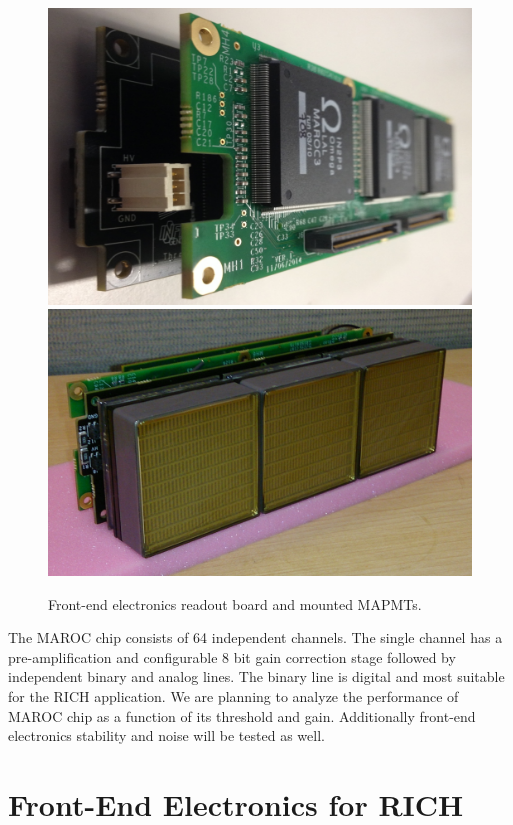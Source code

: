 \begin{figure}[htb]
  \centering
  \includegraphics[width=0.9\linewidth]{figures/fe1.pdf}
  \includegraphics[width=0.9\linewidth]{figures/frontendPMT.pdf}
  \caption{Front-end electronics readout board and mounted MAPMTs.}
  \label{fig:feboards}
\end{figure}

The MAROC chip consists of 64 independent channels.
The single channel has a pre-amplification and configurable 8 bit gain correction stage followed by independent binary and analog lines.
The binary line is digital and most suitable for the RICH application.
We are planning to analyze the performance of MAROC chip as a function of its threshold and gain.
Additionally front-end electronics stability and noise will be tested as well.


\section*{Front-End Electronics for RICH}


